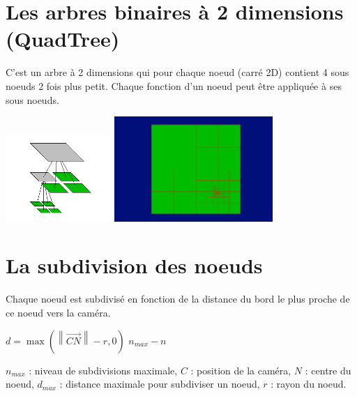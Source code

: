 \documentclass{beamer}
\begin{document}
\section{Les arbres binaires à 2 dimensions (QuadTree)}
\begin{frame}
  C'est un arbre à 2 dimensions qui pour chaque noeud (carré 2D) contient 4 sous noeuds 2 fois plus petit.
  Chaque fonction d'un noeud peut être appliquée à ses sous noeuds.
  \begin{center}
    \includegraphics[width=4cm]{picture_quadtree.png}
    \includegraphics[width=6cm]{terrain_quadtree.png}
  \end{center}
\end{frame}

\section{La subdivision des noeuds}
\begin{frame}
  Chaque noeud est subdivisé en fonction de la distance du bord le plus proche de ce noeud vers la caméra.
  \begin{algorithmic}[1]
    \STATE $d = \max(\left\|\overrightarrow{CN}\right\| - r, 0)$
	\RETURN $n_{max} - n$
      \ENDIF
    \ENDFOR
  \end{algorithmic}
  $n_{max}$ : niveau de subdivisions maximale, $C$ : position de la caméra, $N$ : centre du noeud, 
  $d_{max}$ : distance maximale pour subdiviser un noeud, $r$ : rayon du noeud.
\end{frame}
\end{document}
